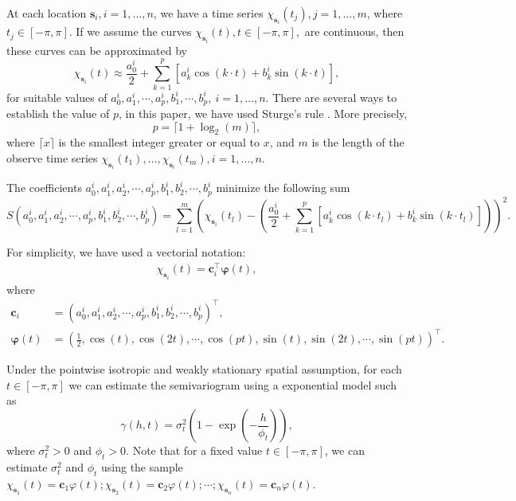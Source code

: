 \documentclass[12pt]{interact}
\theoremstyle{plain}%
\theoremstyle{definition}
\theoremstyle{remark}
\begin{document}
At each location \(\bm{s}_i, i=1, \dots, n\), we have a time series \(\chi_{\bm{s}_i}(t_j), j=1, \dots, m\), where \(t_j \in [-\pi, \pi]\).
If we assume the curves \(\chi_{\bm{s}_i}(t), t\in [-\pi, \pi],\) are continuous, then these curves can be approximated by
\begin{equation*}
\chi_{\bm{s}_i}(t) \approx \dfrac{a_0^i}{2} + \sum_{k=1}^{p} \left[ a_k^i \cos(k\cdot t) + b_k^i \sin(k \cdot t) \right],
\end{equation*}
for suitable values of \(a_0^i, a_1^i, \cdots, a_p^i, b_1^i, \cdots, b_p^i, \ i=1, \dots, n\).
There are several ways to establish the value of \(p\), in this paper, we have used Sturge's rule \citep[see][ for more details]{scott2009sturges}. More precisely,
\begin{equation*}
p= \lceil 1+\log_2(m) \rceil,
\end{equation*}
where \(\lceil x \rceil\) is the smallest integer greater or equal to \(x\), and \(m\) is the length of the observe time series \(\chi_{\bm{s}_i}(t_1), \dots, \chi_{\bm{s}_i}(t_m), i=1, \dots, n\).

The coefficients \(a_0^i, a_1^i, a_2^i, \cdots, a_p^i, b_1^i, b_2^i, \cdots, b_p^i\) minimize the following sum
\begin{equation*}
S(a_0^i, a_1^i, a_2^i, \cdots, a_p^i, b_1^i, b_2^i, \cdots, b_p^i) =  \sum_{l=1}^{m}  \left( \chi_{\bm{s}_i}(t_l) - \left(
\dfrac{a_0^i}{2} + \sum_{k=1}^{p} \left[ a_k^i \cos(k\cdot t_l) + b_k^i \sin(k \cdot t_l) \right] \right) \right)^2 .
\end{equation*}

For simplicity, we have used a vectorial notation:
\begin{align*}
\chi_{\bm{s}_i}(t) =  \bm{c}_i^\top \bm{\varphi}(t),
\end{align*}
where
\begin{align*}
\bm{c}_i &= \left(a_0^i, a_1^i, a_2^i, \cdots, a_p^i, b_1^i, b_2^i, \cdots, b_p^i\right) ^\top,\\
\bm{\varphi}(t) &= \left( \frac{1}{2}, \cos(t), \cos(2t) , \cdots, \cos(pt), \sin(t), \sin(2t) , \cdots, \sin(pt)\right)^\top.
\end{align*}

Under the pointwise isotropic and weakly stationary spatial assumption, for each \(t \in [-\pi, \pi]\) we can estimate the semivariogram using a exponential model such as
\begin{equation*}
\gamma(h, t) = \sigma_t^2 \left(1-\exp\left( -\dfrac{h}{\phi_t} \right)\right),
\end{equation*}
where \(\sigma_t^2 >0\) and \(\phi_t > 0\). Note that for a fixed value \(t \in [-\pi, \pi]\), we can estimate \(\sigma_t^2\) and \(\phi_t\) using the sample \(\chi_{\bm{s}_1}(t)=\bm{c}_1\varphi(t); \chi_{\bm{s}_2}(t)= \bm{c}_2\varphi(t);\cdots; \chi_{\bm{s}_n}(t)=\bm{c}_n\varphi(t)\).
\end{document}
